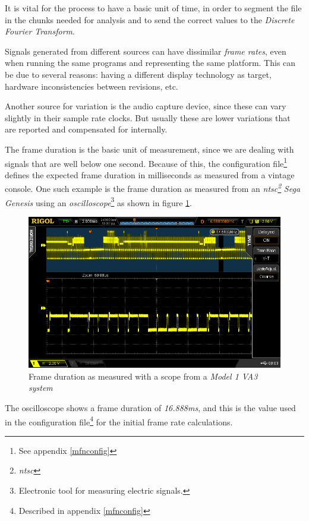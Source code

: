 \documentclass[10pt,a4paper]{report}
\newcommand{\define}[1] {
	\textit{\acrshort{#1}\footnote{\textit{\acrlong{#1}}}}}
\begin{document}
\begin{appendices}
It is vital for the process to have a basic unit of time, in order to segment the file in the chunks needed for analysis and to send the correct values to the \textit{Discrete Fourier Transform}.

Signals generated from different sources can have dissimilar \textit{frame rates}, even when running the same programs and representing the same platform. This can be due to several reasons: having a different display technology as target, hardware inconsistencies between revisions, etc.

Another source for variation is the audio capture device, since these can vary slightly in their sample rate clocks. But usually these are lower variations that are reported and compensated for internally.

The frame duration is the basic unit of measurement, since we are dealing with signals that are well below one second. Because of this, the configuration file\footnote{See appendix \ref{mfnconfig}} defines the expected frame duration in milliseconds as measured from a vintage console. One such example is the frame duration as measured from an \define{ntsc} \textit{Sega Genesis} using an \textit{oscilloscope}\footnote{Electronic tool for measuring electric signals.} as shown in figure \ref{fig:frameratescope}.

\begin{figure}[H]
	\centering
	\includegraphics[width=1.0\linewidth]{images/scope/framerate-scope.png}
	\caption[Scope frame rate]{Frame duration as measured with a scope from a \textit{Model 1 VA3 system}}
	\label{fig:frameratescope}
\end{figure}

The oscilloscope shows a frame duration of \textit{16.888ms}, and this is the value used in the configuration file\footnote{Described in appendix \ref{mfnconfig}} for the initial frame rate calculations.


\end{appendices}
\end{document}
